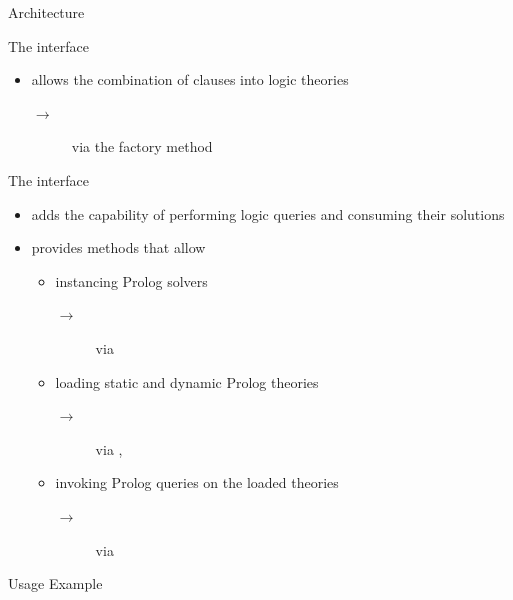 \documentclass[handout]{beamer}
\begin{document}
\begin{frame}[allowframebreaks]{Architecture}
    \framebreak

    \begin{block}{The  interface}
        \begin{itemize}
            \item allows the combination of clauses into logic theories
            \begin{description}
                \item [$\rightarrow$] via the  factory method 
            \end{description}
        \end{itemize}
    \end{block}
    \begin{block}{The  interface}
        \begin{itemize}
            \item adds the capability of performing logic queries and consuming their solutions
            \item provides methods that allow
            \begin{itemize}
                \item instancing Prolog solvers
                \begin{description}
                    \item [$\rightarrow$] via  
                \end{description}
                \item loading static and dynamic Prolog theories
                \begin{description}
                    \item [$\rightarrow$] via , 
                \end{description}
                \item invoking Prolog queries on the loaded theories
                \begin{description}
                    \item [$\rightarrow$] via 
                \end{description}
            \end{itemize}
        \end{itemize}
    \end{block}

\end{frame}

\begin{frame}{Usage Example}
\end{frame}
\end{document}
